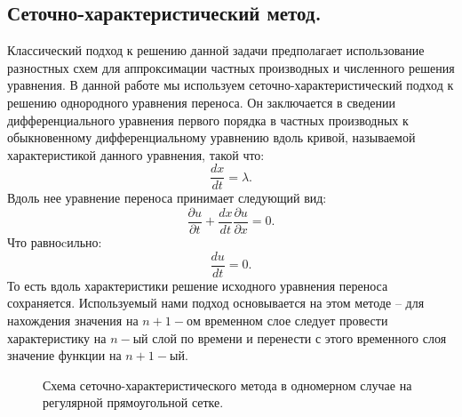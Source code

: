 \documentclass[14pt]{article}
\begin{document}
\subsection{Сеточно-характеристический метод.}
Классический подход к решению данной задачи предполагает использование разностных схем для аппроксимации частных производных и численного решения уравнения. В данной работе мы  используем сеточно-характеристический подход к решению однородного уравнения переноса. Он заключается в сведении дифференциального уравнения первого порядка в частных производных к обыкновенному дифференциальному уравнению вдоль кривой, называемой характеристикой данного уравнения, такой что:
\begin{equation}
\frac{dx}{dt}=\lambda.
\end{equation}
Вдоль нее уравнение переноса принимает следующий вид:
\begin{equation}
\frac{\partial u}{\partial t} + \frac{dx}{dt} \frac{\partial u}{\partial x}=0 .
\end{equation}
Что равноcильно:
\begin{equation}
\frac{du}{dt}=0.
\end{equation}
То есть вдоль характеристики решение исходного уравнения переноса сохраняется. Используемый нами подход основывается на этом методе – для нахождения значения на $n + 1 - ом$ временном слое следует провести характеристику на $n-ый$ слой по времени и перенести с этого временного слоя значение функции на $n+1-ый$.
\begin{figure}[!h]
\caption{Схема сеточно-характеристического метода в одномерном случае на регулярной прямоугольной сетке.}
\label{pic1}
\end{figure}
\end{document}
